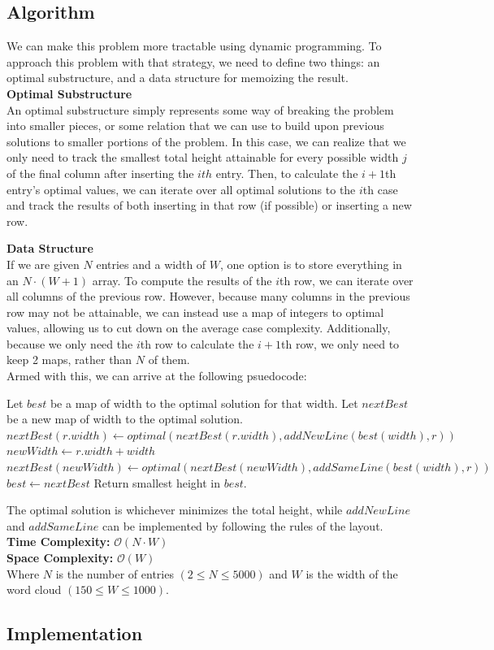 \subsection{Algorithm}

We can make this problem more tractable using dynamic programming. To approach
this problem with that strategy, we need to define two things: an optimal
substructure, and a data structure for memoizing the result.\\

\textbf{Optimal Substructure}\\
An optimal substructure simply represents some way of breaking the problem into
smaller pieces, or some relation that we can use to build upon previous
solutions to smaller portions of the problem. In this case, we can realize that
we only need to track the smallest total height attainable for every possible
width $j$ of the final column after inserting the $ith$ entry. Then, to
calculate the $i+1$th entry's optimal values, we can iterate over all optimal
solutions to the $i$th case and track the results of both inserting in that row
(if possible) or inserting a new row.\\

\pagebreak

\textbf{Data Structure}\\
If we are given $N$ entries and a width of $W$, one option is to store everything
in an $N \cdot (W+1)$ array. To compute the results of the $i$th row, we can
iterate over all columns of the previous row. However, because many columns in
the previous row may not be attainable, we can instead use a map of integers to
optimal values, allowing us to cut down on the average case complexity.
Additionally, because we only need the $i$th row to calculate the $i + 1$th row,
we only need to keep 2 maps, rather than $N$ of them.\\
\hfill\break
Armed with this, we can arrive at the following psuedocode:
\hfill\break
\begin{algorithmic}
  \State Let $best$ be a map of width to the optimal solution for that width.
    \State Let $nextBest$ be a new map of width to the optimal solution.
      \State $nextBest(r.width) \gets optimal(nextBest(r.width),
        addNewLine(best(width), r))$
        \State $newWidth \gets r.width + width$
        \State $nextBest(newWidth) \gets optimal(nextBest(newWidth),
          addSameLine(best(width), r))$
      \EndIf
    \EndFor
    \State $best \gets nextBest$
  \EndFor
  \State Return smallest height in $best$.
\end{algorithmic}
\hfill\break
The optimal solution is whichever minimizes the total height, while $addNewLine$
and $addSameLine$ can be implemented by following the rules of the layout.\\
\hfill\break
\textbf{Time Complexity:} $\mathcal{O}(N \cdot W)$\\
\textbf{Space Complexity:} $\mathcal{O}(W)$\\
Where $N$ is the number of entries $(2 \leq N \leq 5000)$ and $W$ is the width
of the word cloud $(150 \leq W \leq 1000)$.
\pagebreak
\subsection{Implementation}

\pagebreak

\pagebreak
